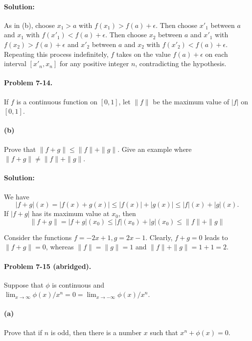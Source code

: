 \documentclass{article}
\begin{document}
\paragraph{Solution:} As in (b), choose $x_1 > a$ with $f(x_1) > f(a) +
\epsilon$. Then choose $x'_1$ between $a$ and $x_1$ with $f(x'_1) < f(a) +
\epsilon$. Then choose $x_2$ between $a$ and $x'_1$ with $f(x_2) > f(a) +
\epsilon$ and $x'_2$ between $a$ and $x_2$ with $f(x'_2) < f(a) + \epsilon$.
Repeating this process indefinitely, $f$ takes on the value $f(a) + \epsilon$
on each interval $[x'_n, x_n]$ for any positive integer $n$, contradicting the
hypothesis.

\paragraph{Problem 7-14.} If $f$ is a continuous function on $[0, 1]$, let
$\|f\|$ be the maximum value of $|f|$ on $[0, 1]$.

\paragraph{(b)} Prove that $\|f + g\| \leq \|f\| + \|g\|$. Give an example
where $\|f + g\| \neq \|f\| + \|g\|$.

\paragraph{Solution:} We have \begin{equation*}
  |f + g|(x) = |f(x) + g(x)| \leq |f(x)| + |g(x)| \leq |f|(x) + |g|(x).
\end{equation*}
If $|f + g|$ has its maximum value at $x_0$, then \begin{equation*}
  \|f + g\| = |f + g|(x_0) \leq |f|(x_0) + |g|(x_0) \leq \|f\| + \|g\|
\end{equation*}

Consider the functions $f = -2x + 1, g = 2x - 1$. Clearly, $f + g = 0$ leads to
$\|f + g\| = 0$, whereas $\|f\| = \|g\| = 1$ and $\|f\| + \|g\| = 1 + 1 = 2$.

\paragraph{Problem 7-15 (abridged).} Suppose that $\phi$ is continuous and
$\lim_{x \rightarrow \infty}\phi(x)/x^n = 0 = \lim_{x \rightarrow -\infty}
\phi(x)/x^n$.

\paragraph{(a)} Prove that if $n$ is odd, then there is a number $x$ such that
$x^n + \phi(x) = 0$.
\end{document}
